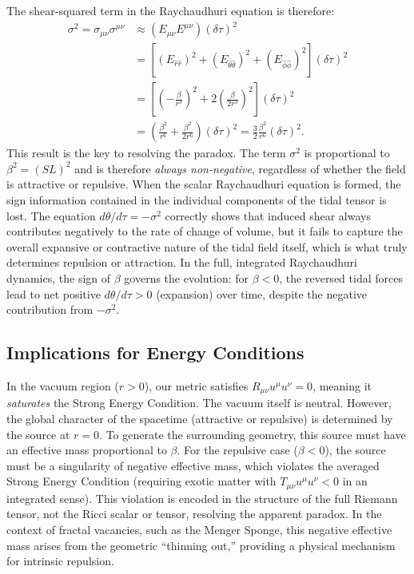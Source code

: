 \documentclass[%
  reprint,
  superscriptaddress,
  showpacs,
  showkeys,
  amsmath,amssymb,
  pra,
  longbibliography,
  floatfix,
]{revtex4-2}
\begin{document}
The shear-squared term in the Raychaudhuri equation is therefore:
\begin{align}
\sigma^2 = \sigma_{\mu\nu}\sigma^{\mu\nu} &\approx (E_{\mu\nu}E^{\mu\nu}) (\delta\tau)^2 \nonumber \\
&= \left[ (E_{\hat{r}\hat{r}})^2 + (E_{\hat{\theta}\hat{\theta}})^2 + (E_{\hat{\phi}\hat{\phi}})^2 \right] (\delta\tau)^2 \nonumber \\
&= \left[ \left(-\frac{\beta}{r^3}\right)^2 + 2\left(\frac{\beta}{2r^3}\right)^2 \right] (\delta\tau)^2 \nonumber \\
&= \left( \frac{\beta^2}{r^6} + \frac{\beta^2}{2r^6} \right) (\delta\tau)^2 = \frac{3}{2}\frac{\beta^2}{r^6}(\delta\tau)^2.
\end{align}
This result is the key to resolving the paradox. The term $\sigma^2$ is proportional to $\beta^2 = (SL)^2$ and is therefore \emph{always non-negative}, regardless of whether the field is attractive or repulsive. When the scalar Raychaudhuri equation is formed, the sign information contained in the individual components of the tidal tensor is lost. The equation $d\theta/d\tau = -\sigma^2$ correctly shows that induced shear always contributes negatively to the rate of change of volume, but it fails to capture the overall expansive or contractive nature of the tidal field itself, which is what truly determines repulsion or attraction. In the full, integrated Raychaudhuri dynamics, the sign of $\beta$ governs the evolution: for $\beta < 0$, the reversed tidal forces lead to net positive $d\theta/d\tau > 0$ (expansion) over time, despite the negative contribution from $-\sigma^2$.

\subsection{Implications for Energy Conditions}
In the vacuum region ($r > 0$), our metric satisfies $R_{\mu\nu} u^\mu u^\nu = 0$, meaning it \emph{saturates} the Strong Energy Condition. The vacuum itself is neutral. However, the global character of the spacetime (attractive or repulsive) is determined by the source at $r=0$. To generate the surrounding geometry, this source must have an effective mass proportional to $\beta$. For the repulsive case ($\beta < 0$), the source must be a singularity of negative effective mass, which violates the averaged Strong Energy Condition (requiring exotic matter with $T_{\mu\nu} u^\mu u^\nu < 0$ in an integrated sense). This violation is encoded in the structure of the full Riemann tensor, not the Ricci scalar or tensor, resolving the apparent paradox. In the context of fractal vacancies, such as the Menger Sponge, this negative effective mass arises from the geometric ``thinning out,'' providing a physical mechanism for intrinsic repulsion.



\end{document}
